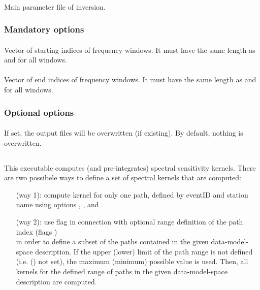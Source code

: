 \paragraph{}
Main parameter file of inversion.
\subsubsection{Mandatory options}
\paragraph{}
Vector of starting indices of  frequency windows. It must have the same length  
as  and  for all windows.
\paragraph{}
Vector of end indices of  frequency windows. It must have the same length  
as  and  for all windows.
\subsubsection{Optional options}
\paragraph{}
If set, the output files will be overwritten (if existing). By default, nothing is overwritten.
%
%
\subsection{} \label{programs_scripts,sec:bin_prog,sec:com_kernel}
This executable computes (and pre-integrates) spectral sensitivity kernels. 
There are two possibele ways to define a set of spectral kernels that are computed:
\begin{itemize}
\item[(way 1):] compute kernel for only one path, defined by eventID and station name using options , ,  and 
\item[(way 2):] use flag  in connection with optional range definition of the path index (flags  )\\
in order to define a subset of the paths contained in the given data-model-space description. If the upper (lower) limit of the path range is not defined (i.e.  () not set), the maximum (minimum) possible value is used. Then, all kernels for the defined range of paths in the given data-model-space description are computed.
\end{itemize}
